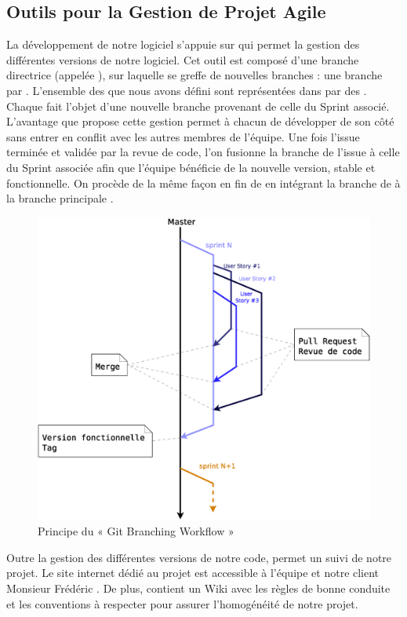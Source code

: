 \subsection{Outils pour la Gestion de Projet Agile}
La développement de notre logiciel s’appuie sur  qui permet la gestion des différentes versions de notre logiciel. 
Cet outil est composé d’une branche directrice (appelée ), sur laquelle se greffe de nouvelles branches : une branche par . L’ensemble des  que nous avons défini sont représentées dans  par des . Chaque  fait l’objet d’une nouvelle branche provenant de celle du Sprint associé. L’avantage que propose cette gestion permet à chacun de développer de son côté sans entrer en conflit avec les autres membres de l’équipe. Une fois l’issue terminée et validée par la revue de code, l’on fusionne la branche de l’issue à celle du Sprint associée afin que l’équipe bénéficie de la nouvelle version, stable et fonctionnelle. On procède de la même façon en fin de  en intégrant la branche de  à la branche principale .

\begin{figure}[H]
	\centering
	\includegraphics*[width=12cm]{screens/BranchingWorkflow.eps}
	\caption{Principe du « Git Branching Workflow »}
\end{figure}

Outre la gestion des différentes versions de notre code,  permet un suivi de notre projet. Le site internet  dédié au projet est accessible à l’équipe et notre client Monsieur Frédéric . 
De plus,  contient un Wiki avec les règles de bonne conduite et les conventions à respecter pour assurer l’homogénéité de notre projet. 

